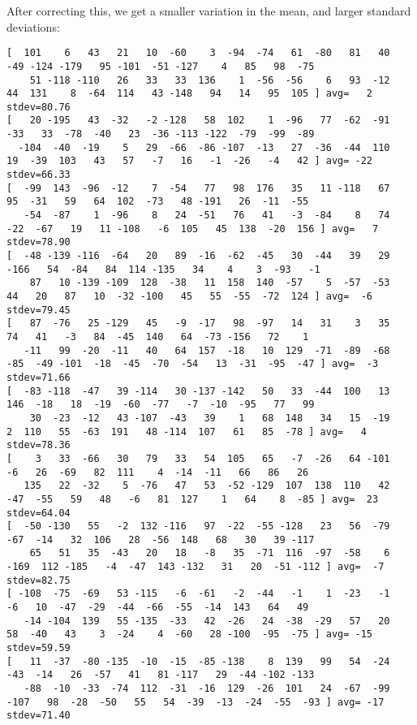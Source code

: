After correcting this, we get a smaller variation in the mean, and larger standard deviations:
{\tiny
\begin{verbatim}
[  101    6   43   21   10  -60    3  -94  -74   61  -80   81   40  -49 -124 -179   95 -101  -51 -127    4   85   98  -75
    51 -118 -110   26   33   33  136    1  -56  -56    6   93  -12   44  131    8  -64  114   43 -148   94   14   95  105 ] avg=   2 stdev=80.76
[   20 -195   43  -32   -2 -128   58  102    1  -96   77  -62  -91  -33   33  -78  -40   23  -36 -113 -122  -79  -99  -89
  -104  -40  -19    5   29  -66  -86 -107  -13   27  -36  -44  110   19  -39  103   43   57   -7   16   -1  -26   -4   42 ] avg= -22 stdev=66.33
[  -99  143  -96  -12    7  -54   77   98  176   35   11 -118   67   95  -31   59   64  102  -73   48 -191   26  -11  -55
   -54  -87    1  -96    8   24  -51   76   41   -3  -84    8   74  -22  -67   19   11 -108   -6  105   45  138  -20  156 ] avg=   7 stdev=78.90
[  -48 -139 -116  -64   20   89  -16  -62  -45   30  -44   39   29 -166   54  -84   84  114 -135   34    4    3  -93   -1
    87   10 -139 -109  128  -38   11  158  140  -57    5  -57  -53   44   20   87   10  -32 -100   45   55  -55  -72  124 ] avg=  -6 stdev=79.45
[   87  -76   25 -129   45   -9  -17   98  -97   14   31    3   35   74   41   -3   84  -45  140   64  -73 -156   72    1
   -11   99  -20  -11   40   64  157  -18   10  129  -71  -89  -68  -85  -49 -101  -18  -45  -70  -54   13  -31  -95  -47 ] avg=  -3 stdev=71.66
[  -83 -118  -47   39 -114   30 -137 -142   50   33  -44  100   13  146  -18   18  -19  -60  -77   -7  -10  -95   77   99
    30  -23  -12   43 -107  -43   39    1   68  148   34   15  -19    2  110   55  -63  191   48 -114  107   61   85  -78 ] avg=   4 stdev=78.36
[    3   33  -66   30   79   33   54  105   65   -7  -26   64 -101   -6   26  -69   82  111    4  -14  -11   66   86   26
   135   22  -32    5  -76   47   53  -52 -129  107  138  110   42  -47  -55   59   48   -6   81  127    1   64    8  -85 ] avg=  23 stdev=64.04
[  -50 -130   55   -2  132 -116   97  -22  -55 -128   23   56  -79  -67  -14   32  106   28  -56  148   68   30   39 -117
    65   51   35  -43   20   18   -8   35  -71  116  -97  -58    6 -169  112 -185   -4  -47  143 -132   31   20  -51 -112 ] avg=  -7 stdev=82.75
[ -108  -75  -69   53 -115   -6  -61   -2  -44   -1    1  -23   -1   -6   10  -47  -29  -44  -66  -55  -14  143   64   49
   -14 -104  139   55 -135  -33   42  -26   24  -38  -29   57   20   58  -40   43    3  -24    4  -60   28 -100  -95  -75 ] avg= -15 stdev=59.59
[   11  -37  -80 -135  -10  -15  -85 -138    8  139   99   54  -24  -43  -14   26  -57   41   81 -117   29  -44 -102 -133
   -88  -10  -33  -74  112  -31  -16  129  -26  101   24  -67  -99 -107   98  -28  -50   55   54  -39  -13  -24  -55  -93 ] avg= -17 stdev=71.40
\end{verbatim}
}

